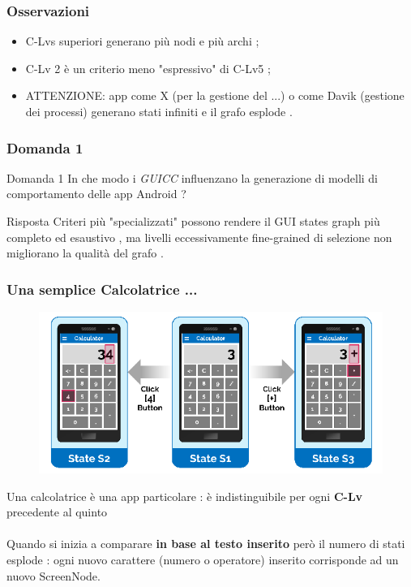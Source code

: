 \documentclass[12pt]{beamer}
\begin{document}

\begin{frame}
\frametitle{Osservazioni}

\begin{itemize}
\item C-Lvs superiori generano pi\`u nodi e pi\`u archi ;

\item C-Lv 2 \`e un criterio meno "espressivo" di C-Lv5 ;

\item ATTENZIONE: app come X (per la gestione del ...) o come Davik (gestione dei processi) generano stati infiniti e il grafo esplode .

\end{itemize}

\end{frame}


\begin{frame}
\frametitle{Domanda 1}

\begin{block}{Domanda 1}
In che modo i \emph{GUICC} influenzano la generazione di modelli di comportamento delle app Android ?
\end{block} 
\begin{block}{Risposta}
Criteri pi\`u "specializzati" possono rendere il GUI states graph pi\`u completo ed esaustivo , ma livelli eccessivamente fine-grained di selezione non  migliorano la qualit\`a del grafo .
\end{block}

\end{frame}


\begin{frame}

\frametitle{Una semplice Calcolatrice ...}
\begin{figure}
\includegraphics[width=0.8\linewidth]{images/calculator.png}
\end{figure}
Una calcolatrice \`e una app particolare : \`e indistinguibile per ogni \textbf{C-Lv} precedente al quinto
\\~\\
Quando si inizia a comparare \textbf{in base al testo inserito} per\`o il numero di stati esplode : ogni nuovo carattere (numero o operatore) inserito corrisponde ad un nuovo ScreenNode.
\end{frame} 
\end{document}
